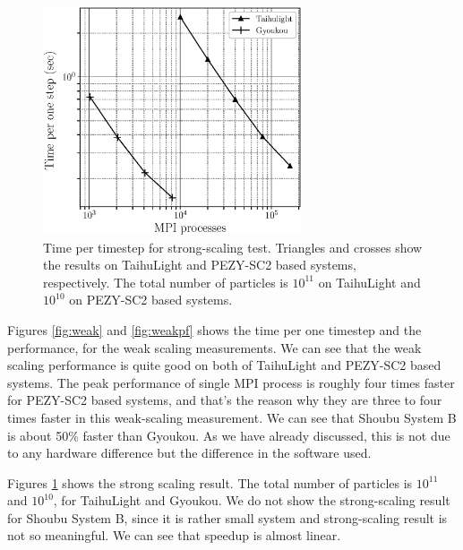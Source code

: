 \documentclass[conference]{IEEEtran}
\begin{document}
\begin{figure}
\includegraphics[width=3in]{strong_scaling}
\caption{Time per timestep for strong-scaling test.  Triangles and crosses  show the
  results on TaihuLight and PEZY-SC2 based systems, respectively. The total number of
  particles is $10^{11}$ on TaihuLight and $10^{10}$ on PEZY-SC2 based systems.}
\label{fig:strong}
\end{figure}


Figures \ref{fig:weak} and \ref{fig:weakpf} shows the time per one
timestep and the performance, for the weak scaling measurements. We
can see that the weak scaling performance is quite good on both of
TaihuLight and PEZY-SC2 based systems. The peak performance of single
MPI process is roughly four times faster for PEZY-SC2 based systems,
and that's the reason why they are three to four times faster in this
weak-scaling measurement. We can see that Shoubu System B is about
50\% faster than Gyoukou. As we have already discussed, this
is not due to any hardware difference
but the difference in the software used.

Figures \ref{fig:strong} shows the strong scaling result.  The total
number of particles is $10^{11}$ and $10^{10}$, for TaihuLight and
Gyoukou. We do not show the strong-scaling result for Shoubu System B,
since it is rather small system and strong-scaling result is not so
meaningful. 
We can see that speedup is almost linear.
\end{document}

